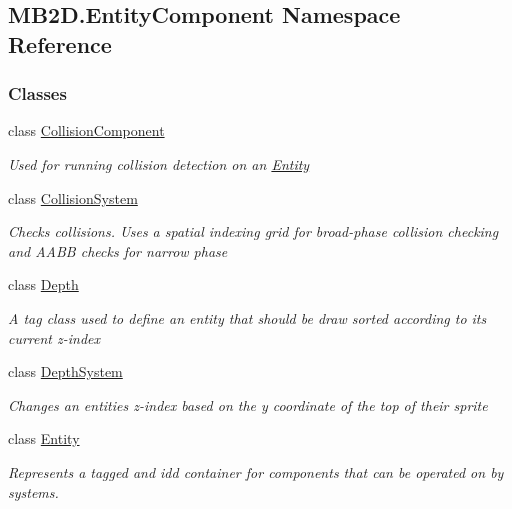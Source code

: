 \hypertarget{namespace_m_b2_d_1_1_entity_component}{}\subsection{M\+B2\+D.\+Entity\+Component Namespace Reference}
\label{namespace_m_b2_d_1_1_entity_component}
\subsubsection*{Classes}
\begin{DoxyCompactItemize}
\item 
class \hyperlink{class_m_b2_d_1_1_entity_component_1_1_collision_component}{Collision\+Component}
\begin{DoxyCompactList}\small\item\em Used for running collision detection on an \hyperlink{class_m_b2_d_1_1_entity_component_1_1_entity}{Entity} \end{DoxyCompactList}\item 
class \hyperlink{class_m_b2_d_1_1_entity_component_1_1_collision_system}{Collision\+System}
\begin{DoxyCompactList}\small\item\em Checks collisions. Uses a spatial indexing grid for broad-\/phase collision checking and A\+A\+BB checks for narrow phase \end{DoxyCompactList}\item 
class \hyperlink{class_m_b2_d_1_1_entity_component_1_1_depth}{Depth}
\begin{DoxyCompactList}\small\item\em A tag class used to define an entity that should be draw sorted according to its current z-\/index \end{DoxyCompactList}\item 
class \hyperlink{class_m_b2_d_1_1_entity_component_1_1_depth_system}{Depth\+System}
\begin{DoxyCompactList}\small\item\em Changes an entities z-\/index based on the y coordinate of the top of their sprite \end{DoxyCompactList}\item 
class \hyperlink{class_m_b2_d_1_1_entity_component_1_1_entity}{Entity}
\begin{DoxyCompactList}\small\item\em Represents a tagged and id\textquotesingle{}d container for components that can be operated on by systems. \end{DoxyCompactList}\item 

\end{DoxyCompactItemize}
